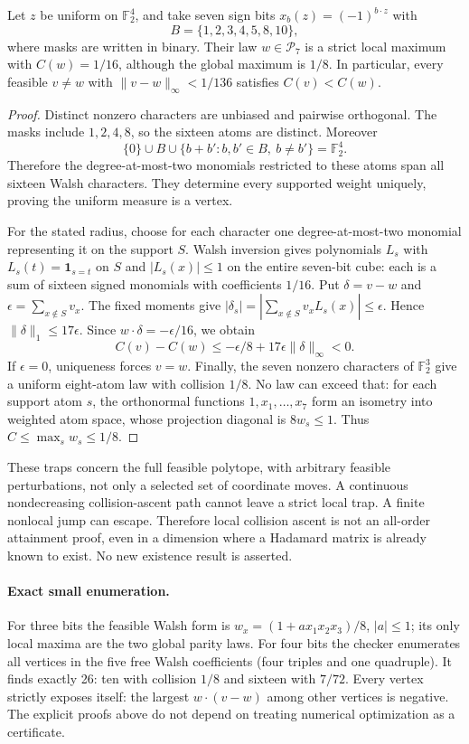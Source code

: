 \begin{theorem}
\label{thm:attainment-admissible-trap}
Let $z$ be uniform on $\mathbb F_2^4$, and take seven sign bits
$x_b(z)=(-1)^{b\cdot z}$ with
\[
 B=\{1,2,3,4,5,8,10\},
\]
where masks are written in binary. Their law $w\in\mathcal P_7$ is
a strict local maximum with $C(w)=1/16$, although the global maximum
is $1/8$. In particular, every feasible $v\ne w$ with
$\|v-w\|_\infty<1/136$ satisfies $C(v)<C(w)$.
\end{theorem}
\begin{proof}
Distinct nonzero characters are unbiased and pairwise orthogonal.
The masks include $1,2,4,8$, so the sixteen atoms are distinct.
Moreover
\[
 \{0\}\cup B\cup\{b+b':b,b'\in B,\ b\ne b'\}
 =\mathbb F_2^4.
\]
Therefore the degree-at-most-two monomials restricted to these atoms
span all sixteen Walsh characters. They determine every supported
weight uniquely, proving the uniform measure is a vertex.

For the stated radius, choose for each character one degree-at-most-two
monomial representing it on the support $S$. Walsh inversion gives
polynomials $L_s$ with $L_s(t)=\mathbf1_{s=t}$ on $S$ and
$|L_s(x)|\le1$ on the entire seven-bit cube: each is a sum of sixteen
signed monomials with coefficients $1/16$.
Put $\delta=v-w$ and $\epsilon=\sum_{x\notin S}v_x$.
The fixed moments give
$|\delta_s|=|\sum_{x\notin S}v_xL_s(x)|\le\epsilon$.
Hence $\|\delta\|_1\le17\epsilon$. Since
$w\cdot\delta=-\epsilon/16$, we obtain
\[
 C(v)-C(w)\le-\epsilon/8+
             17\epsilon\|\delta\|_\infty<0.
\]
If $\epsilon=0$, uniqueness forces $v=w$.
Finally, the seven nonzero characters of $\mathbb F_2^3$ give a
uniform eight-atom law with collision $1/8$. No law can exceed that:
for each support atom $s$, the orthonormal functions $1,x_1,\ldots,x_7$
form an isometry into weighted atom space, whose projection diagonal
is $8w_s\le1$. Thus $C\le\max_s w_s\le1/8$.
\end{proof}
These traps concern the full feasible polytope, with arbitrary feasible
perturbations, not only a selected set of coordinate moves. A continuous
nondecreasing collision-ascent path cannot leave a strict local trap.
A finite nonlocal jump can escape. Therefore local collision ascent is
not an all-order attainment proof, even in a dimension where a Hadamard
matrix is already known to exist. No new existence result is asserted.

\paragraph{Exact small enumeration.}
For three bits the feasible Walsh form is
$w_x=(1+a x_1x_2x_3)/8$, $|a|\le1$; its only local maxima are the two
global parity laws. For four bits the checker enumerates all vertices
in the five free Walsh coefficients (four triples and one quadruple).
It finds exactly 26: ten with collision $1/8$ and sixteen with $7/72$.
Every vertex strictly exposes itself: the largest $w\cdot(v-w)$ among
other vertices is negative. The explicit proofs above do not depend
on treating numerical optimization as a certificate.

